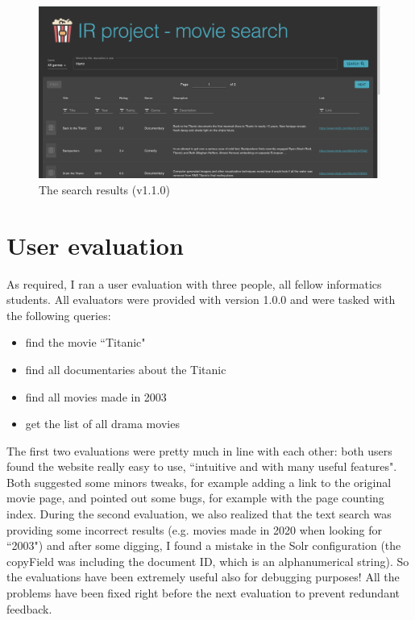 \documentclass[12pt]{article}
\begin{document}
	\begin{figure}[H]
		\centering
		\includegraphics[width=\textwidth]{img/results.png}
		\caption{The search results (v1.1.0)}
		\label{fig:results}
	\end{figure}
	
	\newpage
	

\section{User evaluation}

	As required, I ran a user evaluation with three people, all fellow informatics students. All evaluators were provided with version 1.0.0 and were tasked with the following queries:
	
	\begin{itemize}
		\item find the movie ``Titanic"
	
		\item find all documentaries about the Titanic
	
		\item find all movies made in 2003
	
		\item get the list of all drama movies	
	\end{itemize}
	
	The first two evaluations were pretty much in line with each other: both users found the website really easy to use, ``intuitive and with many useful features". 
	Both suggested some minors tweaks, for example adding a link to the original movie page, and pointed out some bugs, for example with the page counting index. During the second evaluation, we also realized that the text search was providing some incorrect results (e.g. movies made in 2020 when looking for ``2003") and after some digging, I found a mistake in the Solr configuration (the copyField was including the document ID, which is an alphanumerical string). So the evaluations have been extremely useful also for debugging purposes! All the problems have been fixed right before the next evaluation to prevent redundant feedback.\\
	
\end{document}
